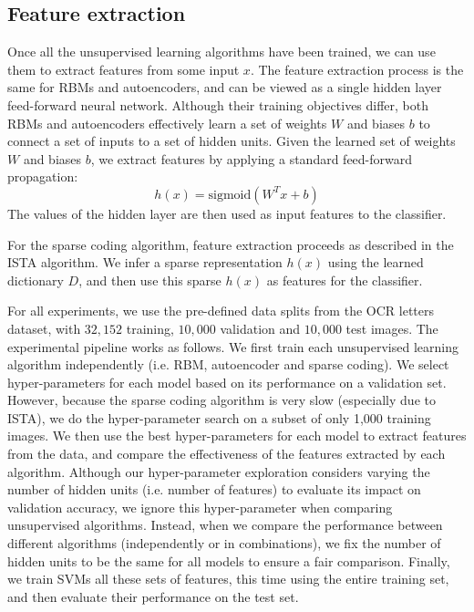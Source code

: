 \documentclass{article} %
\begin{document}
\subsection{Feature extraction}
Once all the unsupervised learning algorithms have been trained, we can use them to extract features from some input $x$. The feature extraction process is the same for RBMs and autoencoders, and can be viewed as a single hidden layer feed-forward neural network. Although their training objectives differ, both RBMs and autoencoders effectively learn a set of weights $W$ and biases $b$ to connect a set of inputs to a set of hidden units. Given the learned set of weights $W$ and biases $b$, we extract features by applying a standard feed-forward propagation:
\begin{equation}
h(x) = \text{sigmoid}(W^T x + b)
\end{equation}
The values of the hidden layer are then used as input features to the classifier.

For the sparse coding algorithm, feature extraction proceeds as described in the ISTA algorithm. We infer a sparse representation $h(x)$ using the learned dictionary $D$, and then use this sparse $h(x)$ as features for the classifier.

For all experiments, we use the pre-defined data splits from the OCR letters dataset, with $32,152$ training, $10,000$ validation and $10,000$ test images. The experimental pipeline works as follows. We first train each unsupervised learning algorithm independently (i.e. RBM, autoencoder and sparse coding). We select hyper-parameters for each model based on its performance on a validation set. However, because the sparse coding algorithm is very slow (especially due to ISTA), we do the hyper-parameter search on a subset of only 1,000 training images. We then use the best hyper-parameters for each model to extract features from the data, and compare the effectiveness of the features extracted by each algorithm. Although our hyper-parameter exploration considers varying the number of hidden units (i.e. number of features) to evaluate its impact on validation accuracy, we ignore this hyper-parameter when comparing unsupervised algorithms. Instead, when we compare the performance between different algorithms (independently or in combinations), we fix the number of hidden units to be the same for all models to ensure a fair comparison. Finally, we train SVMs all these sets of features, this time using the entire training set, and then evaluate their performance on the test set.
\end{document}
